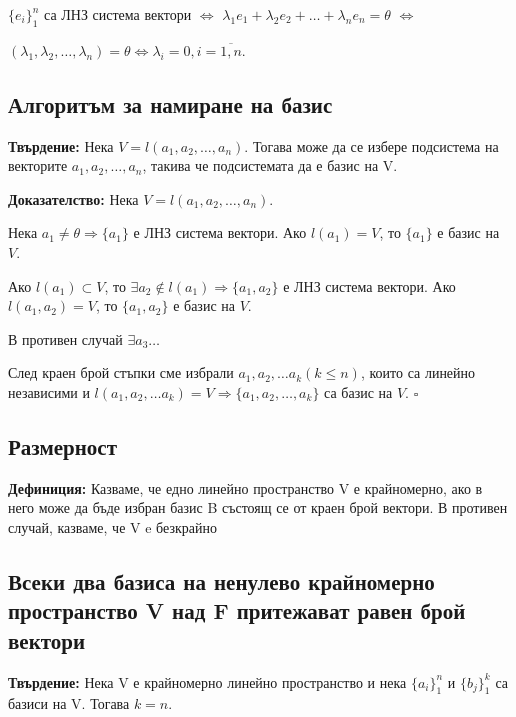 \documentclass[fleqn,12pt]{article}
\begin{document}
\begin{flushleft}
$ \{ e_i\}_1^n $ са ЛНЗ система вектори $\iff$ $ \lambda_1 e_1 + \lambda_2 e_2 + \dots + \lambda_n e_n = \theta $ $\iff$

$ (\lambda_1, \lambda_2, \dots, \lambda_n) = \theta \Leftrightarrow \lambda_i = 0, i = \overline{1,n}$.

\subsection{Алгоритъм за намиране на базис}
\textbf{Твърдение:} Нека $ V = l(a_1, a_2, \dots, a_n) $. Тогава може да се избере подсистема на векторите $ a_1, a_2, \dots, a_n $, такива че подсистемата да е базис на V.

\vspace{5mm}

\textbf{Доказателство:}
Нека $ V = l(a_1, a_2, \dots, a_n) $.

Нека $ a_1 \neq \theta \Rightarrow \{a_1\}$ е ЛНЗ система вектори.
Ако $ l(a_1) = V$, то $\{a_1\}$ е базис на $V$.

\vspace{4mm}

Ако $l(a_1) \subset V$, то $\exists a_2 \notin l(a_1) \Rightarrow \{a_1, a_2\}$ е ЛНЗ система вектори.
Ако $ l(a_1, a_2) = V$, то $\{a_1, a_2\}$ е базис на $V$.

\vspace{4mm}

В противен случай $\exists a_3 \dots$

След краен брой стъпки сме избрали $a_1, a_2, \dots a_k (k \leq n) $, които са линейно независими и $l(a_1, a_2, \dots a_k) = V \Rightarrow \{a_1, a_2, \dots, a_k\}$ са базис на $V$. $\square$

\subsection{Размерност}
\textbf{Дефиниция:} Казваме, че едно линейно пространство V е крайномерно, ако в него може да бъде избран базис B състоящ се от краен брой вектори. В противен случай, казваме, че V e безкрайно

\subsection{Всеки два базиса на ненулево крайномерно пространство V над F притежават равен брой вектори}
\textbf{Твърдение:} Нека V е крайномерно линейно пространство и нека $\{ a_i \}_1^n $ и $\{ b_j \}_1^k $ са базиси на V. Тогава $ k = n $.


\end{flushleft}
\end{document}
